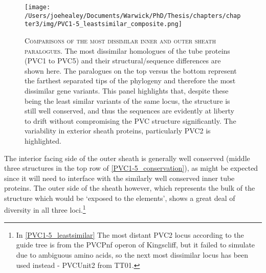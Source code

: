 \begin{landscape}
\begin{figure}[p]
 \centering
  \texttt{[image: /Users/joehealey/Documents/Warwick/PhD/Thesis/chapters/chapter3/img/PVC1-5\_leastsimilar\_composite.png]}
 \captionsetup{singlelinecheck=off, justification=justified, font=footnotesize, aboveskip=10pt}
 \caption[Comparisons of the most dissimilar tube proteins]{\textsc{\normalsize Comparisons of the most dissimilar inner and outer sheath paralogues.}\vspace{0.1cm} \newline The most dissimilar homologues of the tube proteins (PVC1 to PVC5) and their structural/sequence differences are shown here. The paralogues on the top versus the bottom represent the farthest separated tips of the phylogeny and therefore the most dissimilar gene variants. This panel highlights that, despite these being the least similar variants of the same locus, the structure is still well conserved, and thus the sequences are evidently at liberty to drift without compromising the PVC structure significantly. The variability in exterior sheath proteins, particularly PVC2 is highlighted.}
 \label{PVC1-5_leastsimilar}
\end{figure}
\end{landscape}



The interior facing side of the outer sheath is generally well conserved (middle three structures in the top row of \vref{PVC1-5_conservation}), as might be expected since it will need to interface with the similarly well conserved inner tube proteins. The outer side of the sheath however, which represents the bulk of the structure which would be `exposed to the elements', shows a great deal of diversity in all three loci.\footnote{In \vref{PVC1-5_leastsimilar} The most distant PVC2 locus according to the guide tree is from the PVCPnf operon of \Pasy{} Kingscliff, but it failed to simulate due to ambiguous amino acids, so the next most dissimilar locus has been used instead - PVCUnit2 from \Plum{} TT01.}

